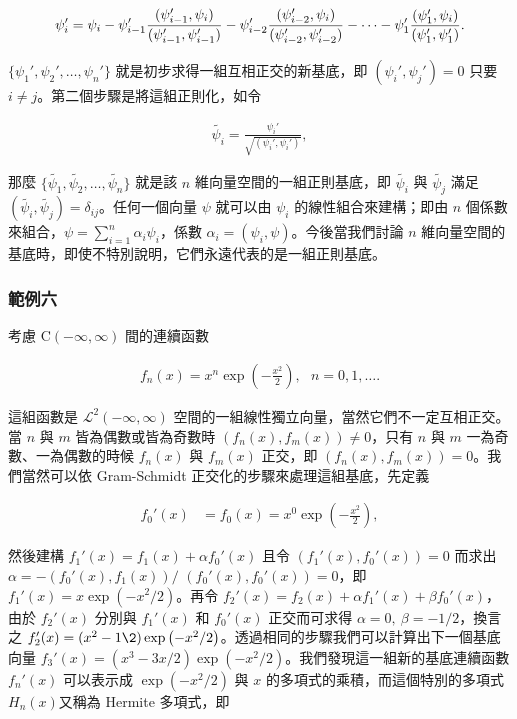 \begin{align}
\notag\psi_i'=\psi_i-\psi_{i-1}'\frac{(\psi_{i-1}',\psi_i)}{(\psi_{i-1}',\psi_{i-1}')}- \psi_{i-2}'\frac{(\psi_{i-2}',\psi_i)}{(\psi_{i-2}',\psi_{i-2}')}-\cdots-\psi_{1}'\frac{(\psi_{1}',\psi_i)}{(\psi_{1}',\psi_{1}')}.
\end{align}

$\{\psi_1',\psi_2',\ldots,\psi_n'\}$ 就是初步求得一組互相正交的新基底，即 $(\psi_i', \psi_j')=0$ 只要 $i\neq j$。第二個步驟是將這組正則化，如令


\begin{align}
\tilde{\psi_i}=\frac{\psi_i'}{\sqrt{(\psi_i',\psi_i')}},
\end{align}

\noindent 那麼 $\{\tilde{\psi_1},\tilde{\psi_2},\ldots,\tilde{\psi_n}\}$ 就是該 $n$ 維向量空間的一組正則基底，即 $\tilde{\psi_i}$ 與 $\tilde{\psi_j}$ 滿足 $(\tilde{\psi_i}, \tilde{\psi_j})=\delta_{ij}$。任何一個向量 $\psi$ 就可以由 $\psi_i$ 的線性組合來建構；即由 $n$ 個係數來組合，$\psi=\sum_{i=1}^n\alpha_i\psi_i$，係數 $\alpha_i=(\psi_i, \psi)$。今後當我們討論 $n$ 維向量空間的基底時，即使不特別說明，它們永遠代表的是一組正則基底。

\subsubsection*{範例六}

考慮 $ \mbox{C}(-\infty,\infty) $ 間的連續函數


\begin{align}
f_n(x)=x^n\exp\left(-\frac{x^2}{2}\right),~~~n=0,1,\ldots.
\end{align}

這組函數是 $ \mathcal{L}^2(-\infty,\infty)$ 空間的一組線性獨立向量，當然它們不一定互相正交。當 $n$ 與 $m$ 皆為偶數或皆為奇數時 $(f_n(x), f_m(x))\neq 0$，只有 $n$ 與 $m$ 一為奇數、一為偶數的時候 $f_n(x)$ 與 $f_m(x)$ 正交，即 $(f_n(x), f_m(x))= 0$。我們當然可以依 Gram-Schmidt 正交化的步驟來處理這組基底，先定義

\begin{align}
f_0'(x)&=f_0(x)=x^0\exp\left(-\frac{x^2}{2}\right),
\end{align}

然後建構 $f_1'(x)=f_1(x)+\alpha f_0'(x)$ 且令 $(f_1'(x), f_0'(x))=0$ 而求出 $\alpha=-(f_0'(x),f_1(x))/$ $(f_0'(x),f_0'(x)) = 0$，即 $f_1'(x)=x\exp\left(-x^2/2\right)$。再令 $f_2'(x)=f_2(x)+\alpha f_1'(x)+\beta f_0'(x)$，由於 $f_2'(x)$ 分別與 $f_1'(x)$ 和 $f_0'(x)$ 正交而可求得 $\alpha=0,~ \beta=-1/2$，換言之 $f_2'(x)=(x^2-1\2)\exp\left(-x^2/2\right)$。透過相同的步驟我們可以計算出下一個基底向量 $f_3'(x)=(x^3-3x/2 )\exp\left(-x^2/2\right)$。我們發現這一組新的基底連續函數 $f_n'(x)$ 可以表示成 $\exp\left(-x^2/2\right)$ 與 $x$ 的多項式的乘積，而這個特別的多項式 $H_n(x)$又稱為 Hermite 多項式，即

